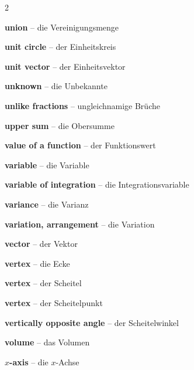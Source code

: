 \begin{multicols}{2}
\par\nopagebreak
\textbf{union} -- die Vereinigungsmenge\dotfill\hyperref[e:101]{\pageref*{e:101}}\par
\textbf{unit circle} -- der Einheitskreis\dotfill\hyperref[e:137]{\pageref*{e:137}}\par
\textbf{unit vector} -- der Einheitsvektor\dotfill\hyperref[e:303]{\pageref*{e:303}}\par
\textbf{unknown} -- die Unbekannte\dotfill\hyperref[e:73]{\pageref*{e:73}}\par
\textbf{unlike fractions} -- ungleichnamige Brüche\dotfill\hyperref[e:35]{\pageref*{e:35}}\par
\textbf{upper sum} -- die Obersumme\dotfill\hyperref[e:293]{\pageref*{e:293}}\par

\par\nopagebreak
\textbf{value of a function} -- der Funktionswert\dotfill\hyperref[e:108]{\pageref*{e:108}}\par
\textbf{variable} -- die Variable\dotfill\hyperref[e:71]{\pageref*{e:71}}\par
\textbf{variable of integration} -- die Integrationsvariable\dotfill\hyperref[e:291]{\pageref*{e:291}}\par
\textbf{variance} -- die Varianz\dotfill\hyperref[e:336]{\pageref*{e:336}}\par
\textbf{variation, arrangement} -- die Variation\dotfill\hyperref[e:342]{\pageref*{e:342}}\par
\textbf{vector} -- der Vektor\dotfill\hyperref[e:301]{\pageref*{e:301}}\par
\textbf{vertex} -- die Ecke\dotfill\hyperref[e:245]{\pageref*{e:245}}\par
\textbf{vertex} -- der Scheitel\dotfill\hyperref[e:154]{\pageref*{e:154}}\par
\textbf{vertex} -- der Scheitelpunkt\dotfill\hyperref[e:129]{\pageref*{e:129}}\par
\textbf{vertically opposite angle} -- der Scheitelwinkel\dotfill\hyperref[e:166]{\pageref*{e:166}}\par
\textbf{volume} -- das Volumen\dotfill\hyperref[e:255]{\pageref*{e:255}}\par

\par\nopagebreak
\textbf{$x$-axis} -- die $x$-Achse\dotfill\hyperref[e:114]{\pageref*{e:114}}\par


\end{multicols}
